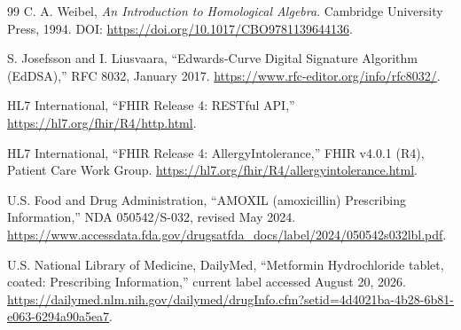 \documentclass[11pt]{article}
\begin{document}
\begin{thebibliography}{99}
C. A. Weibel,
\emph{An Introduction to Homological Algebra}.
Cambridge University Press, 1994.
DOI: \url{https://doi.org/10.1017/CBO9781139644136}.

S. Josefsson and I. Liusvaara,
``Edwards-Curve Digital Signature Algorithm (EdDSA),''
RFC 8032, January 2017.
\url{https://www.rfc-editor.org/info/rfc8032/}.

HL7 International,
``FHIR Release 4: RESTful API,''
\url{https://hl7.org/fhir/R4/http.html}.


HL7 International,
``FHIR Release 4: AllergyIntolerance,''
FHIR v4.0.1 (R4), Patient Care Work Group.
\url{https://hl7.org/fhir/R4/allergyintolerance.html}.

U.S. Food and Drug Administration,
``AMOXIL (amoxicillin) Prescribing Information,''
NDA 050542/S-032, revised May 2024.
\url{https://www.accessdata.fda.gov/drugsatfda_docs/label/2024/050542s032lbl.pdf}.

U.S. National Library of Medicine, DailyMed,
``Metformin Hydrochloride tablet, coated: Prescribing Information,''
current label accessed August 20, 2026.
\url{https://dailymed.nlm.nih.gov/dailymed/drugInfo.cfm?setid=4d4021ba-4b28-6b81-e063-6294a90a5ea7}.

\end{thebibliography}
\end{document}
